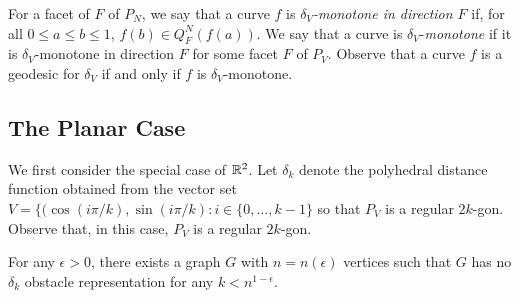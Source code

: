 \documentclass{patmorin}
\begin{document}
For a facet of $F$ of $P_N$, we say that a curve $f$ is
\emph{$\delta_V$-monotone in direction $F$} if, for all $0\le
a\le b\le 1$, $f(b)\in Q^N_F(f(a))$.  We say that a curve is
$\delta_V$-\emph{monotone} if it is $\delta_V$-monotone in direction $F$
for some facet $F$ of $P_V$.  Observe that a curve $f$ is a geodesic
for $\delta_V$ if and only if $f$ is $\delta_V$-monotone.

\subsection{The Planar Case}

We first consider the special case of $\mathbb{R}^2$.  Let $\delta_k$ denote
the polyhedral distance function obtained from the vector set $V =
\{(\cos(i\pi/k),\sin(i\pi/k) : i\in\{0,\ldots,k-1\}$ so that $P_V$
is a regular $2k$-gon.  Observe that, in this case, $P_V$ is a regular
$2k$-gon.


\begin{thm}
  For any $\epsilon >0$, there exists a graph $G$ with $n=n(\epsilon)$
  vertices such that $G$ has no $\delta_k$ obstacle representation for any 
  $k < n^{1-\epsilon}$.
\end{thm}
\end{document}
